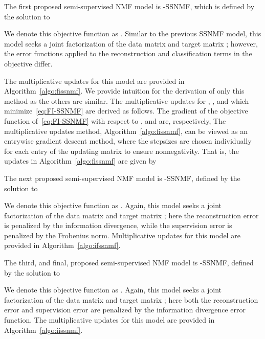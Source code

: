 \documentclass[twocolumn,10pt]{article}
\begin{document}
The first proposed semi-supervised NMF model is -SSNMF, which is defined by the solution to 

We denote this objective function as .  Similar to the previous SSNMF model, this model seeks a joint factorization of the data matrix  and target matrix ; however, the error functions applied to the reconstruction and classification terms in the objective differ.  


The multiplicative updates for this model are provided in Algorithm~\ref{algo:fissnmf}.  We provide intuition for the derivation of only this method as the others are similar. 
The multiplicative updates for , , and  which minimize~\eqref{eq:FI-SSNMF} are derived as follows.
The gradient of the objective function of~\eqref{eq:FI-SSNMF} with respect to ,  and  are, respectively,
The multiplicative updates method, Algorithm~\ref{algo:fissnmf}, can be viewed as an entrywise gradient descent method, where the stepsizes are chosen individually for each entry of the updating matrix to ensure nonnegativity. That is, the updates in Algorithm~\ref{algo:fissnmf} are given by 



The next proposed semi-supervised NMF model is -SSNMF, 
defined by the solution to 

We denote this objective function as .
Again, this model seeks a joint factorization of the data matrix  and target matrix ; here the reconstruction error is penalized by the information divergence, while the supervision error is penalized by the Frobenius norm.  
Multiplicative updates for this model are provided in Algorithm~\ref{algo:ifssnmf}.
 


The third, and final, proposed semi-supervised NMF model is -SSNMF, 
defined by the solution to 

We denote this objective function as .
Again, this model seeks a joint factorization of the data matrix  and target matrix ; here both the reconstruction error and supervision error are penalized by the information 
divergence error function.  
The multiplicative updates for this model are provided in Algorithm~\ref{algo:iissnmf}.
\end{document}
